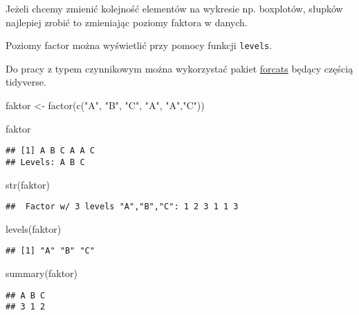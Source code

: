\documentclass[
]{book}
\newenvironment{Shaded}{\begin{snugshade}}{\end{snugshade}}
\newcommand{\FunctionTok}[1]{\textcolor[rgb]{0.00,0.00,0.00}{#1}}
\newcommand{\NormalTok}[1]{#1}
\newcommand{\OtherTok}[1]{\textcolor[rgb]{0.56,0.35,0.01}{#1}}
\newcommand{\StringTok}[1]{\textcolor[rgb]{0.31,0.60,0.02}{#1}}
\begin{document}
Jeżeli chcemy zmienić kolejność elementów na wykresie np. boxplotów, słupków najlepiej zrobić to zmieniając poziomy faktora w danych.

Poziomy factor można wyświetlić przy pomocy funkcji \texttt{levels}.

Do pracy z typem czynnikowym można wykorzystać pakiet \href{https://forcats.tidyverse.org/}{forcats} będący częścią tidyverse.

\begin{Shaded}
\begin{Highlighting}[]
\NormalTok{faktor }\OtherTok{\textless{}{-}} \FunctionTok{factor}\NormalTok{(}\FunctionTok{c}\NormalTok{(}\StringTok{"A"}\NormalTok{, }\StringTok{"B"}\NormalTok{, }\StringTok{"C"}\NormalTok{, }\StringTok{"A"}\NormalTok{, }\StringTok{"A"}\NormalTok{,}\StringTok{"C"}\NormalTok{))}

\NormalTok{faktor}
\end{Highlighting}
\end{Shaded}

\begin{verbatim}
## [1] A B C A A C
## Levels: A B C
\end{verbatim}

\begin{Shaded}
\begin{Highlighting}[]
\FunctionTok{str}\NormalTok{(faktor)}
\end{Highlighting}
\end{Shaded}

\begin{verbatim}
##  Factor w/ 3 levels "A","B","C": 1 2 3 1 1 3
\end{verbatim}

\begin{Shaded}
\begin{Highlighting}[]
\FunctionTok{levels}\NormalTok{(faktor)}
\end{Highlighting}
\end{Shaded}

\begin{verbatim}
## [1] "A" "B" "C"
\end{verbatim}

\begin{Shaded}
\begin{Highlighting}[]
\FunctionTok{summary}\NormalTok{(faktor)}
\end{Highlighting}
\end{Shaded}

\begin{verbatim}
## A B C 
## 3 1 2
\end{verbatim}
\end{document}
